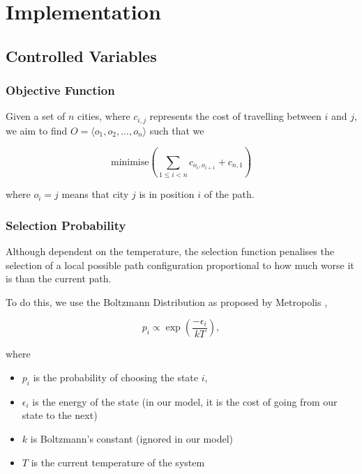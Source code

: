 \documentclass{article}
\begin{document}
\newpage
\section{Implementation}

\subsection{Controlled Variables}

\subsubsection{Objective Function}

Given a set of $n$ cities, where $c_{i,j}$ represents the cost of travelling between $i$ and $j$, we aim to find $O = \langle o_1, o_2, ..., o_n \rangle$ such that we 

$$\text{minimise}\left( \sum_{1 \leq i < n} c_{o_i, o_{i + 1}} + c_{n, 1}\right)$$

where $o_i = j$ means that city $j$ is in position $i$ of the path.
\\

\subsubsection{Selection Probability}

Although dependent on the temperature, the selection function penalises the selection of a local possible path configuration proportional to how much worse it is than the current path.

To do this, we use the Boltzmann Distribution as proposed by Metropolis \cite{metropolis},

$$p_i \propto \exp \left( \frac{- \epsilon_i}{kT} \right),$$

where
\begin{itemize}
    \item $p_i$ is the probability of choosing the state $i$,
    \item $\epsilon_i$ is the energy of the state (in our model, it is the cost of going from our state to the next)
    \item $k$ is Boltzmann's constant (ignored in our model)
    \item $T$ is the current temperature of the system
\end{itemize}
\end{document}
